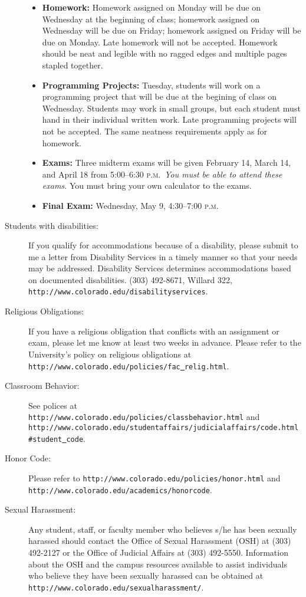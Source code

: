 \documentclass[11pt]{article}
\newcommand{\PM}{\textsc{p.m.}}
\newcommand{\url}[1]{\texttt{#1}}
\begin{document}
\begin{description}
\begin{itemize}
	\item \textbf{Homework:} Homework assigned on Monday will be due on Wednesday at the beginning of class; homework assigned on Wednesday will be due on Friday; homework assigned on Friday will be due on Monday. Late homework will not be accepted. Homework should be neat and legible with no ragged edges and multiple pages stapled together.
	
	\item \textbf{Programming Projects:} Tuesday, students will work on a programming project that will be due at the begining of class on Wednesday. Students may work in small groups, but each student must hand in their individual written work. Late programming projects will not be accepted. The same neatness requirements apply as for homework.
	\item \textbf{Exams:} Three midterm exams will be given February 14, March 14, and April 18 from 5:00--6:30 \PM\ \emph{You must be able to attend these exams.} You must bring your own calculator to the exams.
	\item \textbf{Final Exam:} Wednesday, May 9, 4:30--7:00 \PM
\end{itemize}

\item[Students with disabilities: ]
If you qualify for accommodations because of a disability, please submit to me a letter from Disability Services in a timely manner so that your needs may be addressed.  Disability Services determines accommodations based on documented disabilities. (303) 492-8671, Willard 322, \url{http://www.colorado.edu/disabilityservices}.

\item[Religious Obligations: ]
If you have a religious obligation that conflicts with an assignment or exam, please let me know at least two weeks in advance. Please refer to the University's policy on religious obligations at \url{http://www.colorado.edu/policies/fac\underline{\ }relig.html}.

\item[Classroom Behavior: ]
See polices at \\
\url{http://www.colorado.edu/policies/classbehavior.html} and  \\
\url{http://www.colorado.edu/studentaffairs/judicialaffairs/code.html\#student\underline{\ }code}.

\item[Honor Code: ] Please refer to \url{http://www.colorado.edu/policies/honor.html} and \\
\url{http://www.colorado.edu/academics/honorcode}.

\item[Sexual Harassment: ]
Any student, staff, or faculty member who believes s/he has been sexually harassed should contact the Office of Sexual Harassment (OSH) at (303) 492-2127 or the Office of Judicial Affairs at (303) 492-5550. Information about the OSH and the campus resources available to assist individuals who believe they have been sexually harassed can be obtained at \url{http://www.colorado.edu/sexualharassment/}.
\end{description}
\end{document}
